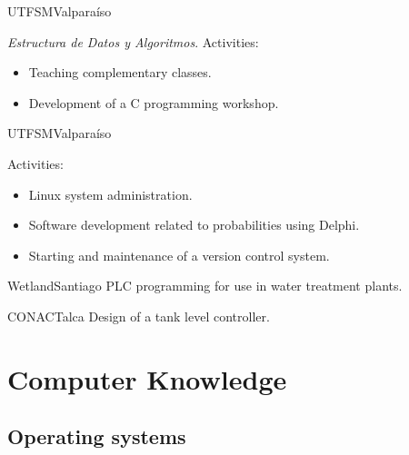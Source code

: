 \documentclass[11pt,letterpaper,sans]{moderncv}
\begin{document}
    \pagebreak[0]

      {UTFSM}{Valparaíso}{}
      {
        \emph{Estructura de Datos y Algoritmos}.\newline{}
        Activities:
        \begin{itemize}
          \item Teaching complementary classes.
          \item Development of a C programming workshop.
        \end{itemize}
      }

    \pagebreak[0]

      {UTFSM}{Valparaíso}{}
      {
      Activities:
        \begin{itemize}
          \item Linux system administration.
          \item Software development related to probabilities using Delphi.
          \item Starting and maintenance of a version control system.
        \end{itemize}
      }

    \pagebreak[0]

      {Wetland}{Santiago}{}
      {
        PLC programming for use in water treatment plants.
      }

    \pagebreak[0]

      {CONAC}{Talca}{}
      {
        Design of a tank level controller.
      }

  \pagebreak[0]

  \section{Computer Knowledge}
    \subsection{Operating systems}
      \begin{cvcolumns}
      \end{cvcolumns}
\end{document}
